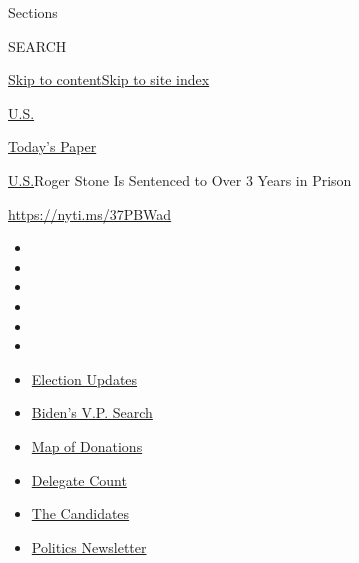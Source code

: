 Sections

SEARCH

\protect\hyperlink{site-content}{Skip to
content}\protect\hyperlink{site-index}{Skip to site index}

\href{https://www.nytimes.com/section/us}{U.S.}

\href{https://myaccount.nytimes.com/auth/login?response_type=cookie\&client_id=vi}{}

\href{https://www.nytimes.com/section/todayspaper}{Today's Paper}

\href{/section/us}{U.S.}\textbar{}Roger Stone Is Sentenced to Over 3
Years in Prison

\url{https://nyti.ms/37PBWad}

\begin{itemize}
\item
\item
\item
\item
\item
\item
\end{itemize}

\begin{itemize}
\item
  \href{https://www.nytimes.com/2020/07/31/us/elections/biden-vs-trump.html?action=click\&pgtype=Article\&state=default\&region=TOP_BANNER\&context=storylines_menu}{Election
  Updates}
\item
  \href{https://www.nytimes.com/article/biden-vice-president-2020.html?action=click\&pgtype=Article\&state=default\&region=TOP_BANNER\&context=storylines_menu}{Biden's
  V.P. Search}
\item
  \href{https://www.nytimes.com/interactive/2020/07/24/us/politics/trump-biden-campaign-donors.html?action=click\&pgtype=Article\&state=default\&region=TOP_BANNER\&context=storylines_menu}{Map
  of Donations}
\item
  \href{https://www.nytimes.com/interactive/2020/us/elections/delegate-count-primary-results.html?action=click\&pgtype=Article\&state=default\&region=TOP_BANNER\&context=storylines_menu}{Delegate
  Count}
\item
  \href{https://www.nytimes.com/interactive/2019/us/politics/2020-presidential-candidates.html?action=click\&pgtype=Article\&state=default\&region=TOP_BANNER\&context=storylines_menu}{The
  Candidates}
\item
  \href{https://www.nytimes.com/newsletters/politics?action=click\&pgtype=Article\&state=default\&region=TOP_BANNER\&context=storylines_menu}{Politics
  Newsletter}
\end{itemize}


